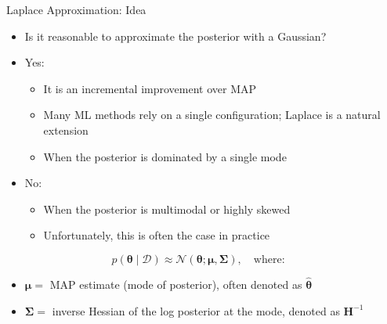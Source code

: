 \documentclass{beamer}
\begin{document}
\begin{frame}{Laplace Approximation: Idea}
  \begin{itemize}
  \item Is it reasonable to approximate the posterior with a Gaussian?
  \item Yes:
    \begin{itemize}
    \item It is an incremental improvement over MAP
    \item Many ML methods rely on a single configuration; Laplace is a natural extension
    \item When the posterior is dominated by a single mode
      \end{itemize}
  \item No:
    \begin{itemize}
    \item When the posterior is multimodal or highly skewed
    \item Unfortunately, this is often the case in practice
    \end{itemize}
\end{itemize}

\[
p(\boldsymbol{\theta} \mid \mathcal{D}) \approx \mathcal{N}(\bm{\theta}; \bm{\mu}, \bm{\Sigma}), \quad \text{where:} \quad
\]
\begin{itemize}
    \item[] \(\bm{\mu} = \) MAP estimate (mode of posterior), often denoted as \(\hat{\boldsymbol{\theta}}\)
    \item[] \(\bm{\Sigma} = \) inverse Hessian of the log posterior at the mode, denoted as \(\mathbf{H}^{-1}\)
\end{itemize}
\end{frame}
\end{document}
